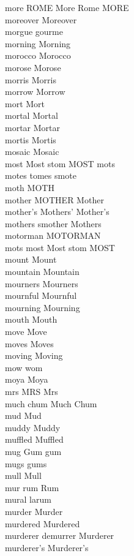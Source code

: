 more ROME More Rome MORE\\
moreover Moreover\\
morgue gourme\\
morning Morning\\
morocco Morocco\\
morose Morose\\
morris Morris\\
morrow Morrow\\
mort Mort\\
mortal Mortal\\
mortar Mortar\\
mortis Mortis\\
mosaic Mosaic\\
most Most stom MOST mots\\
motes tomes smote\\
moth MOTH\\
mother MOTHER Mother\\
mother's Mothers' Mother's\\
mothers smother Mothers\\
motorman MOTORMAN\\
mots most Most stom MOST\\
mount Mount\\
mountain Mountain\\
mourners Mourners\\
mournful Mournful\\
mourning Mourning\\
mouth Mouth\\
move Move\\
moves Moves\\
moving Moving\\
mow wom\\
moya Moya\\
mrs MRS Mrs\\
much chum Much Chum\\
mud Mud\\
muddy Muddy\\
muffled Muffled\\
mug Gum gum\\
mugs gums\\
mull Mull\\
mur rum Rum\\
mural larum\\
murder Murder\\
murdered Murdered\\
murderer demurrer Murderer\\
murderer's Murderer's\\
